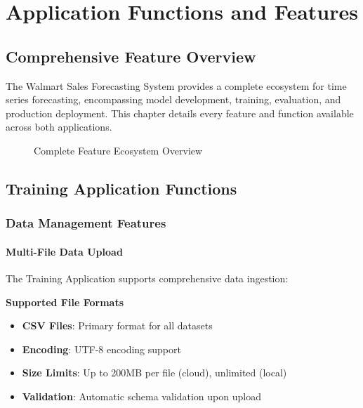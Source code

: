 %
%
%



\chapter{Application Functions and Features}

\section{Comprehensive Feature Overview}

The Walmart Sales Forecasting System provides a complete ecosystem for time series forecasting, encompassing model development, training, evaluation, and production deployment. This chapter details every feature and function available across both applications.

\begin{figure}[H]
	\centering
	
	\caption{Complete Feature Ecosystem Overview}
	\label{fig:feature_ecosystem}
\end{figure}

\section{Training Application Functions}

\subsection{Data Management Features}

\subsubsection{Multi-File Data Upload}

The Training Application supports comprehensive data ingestion:

\textbf{Supported File Formats}
\begin{itemize}
	\item \textbf{CSV Files}: Primary format for all datasets
	\item \textbf{Encoding}: UTF-8 encoding support
	\item \textbf{Size Limits}: Up to 200MB per file (cloud), unlimited (local)
	\item \textbf{Validation}: Automatic schema validation upon upload
\end{itemize}

